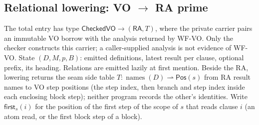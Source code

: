 \subsection{Relational lowering: VO $\to$ RA prime}
The total entry has type
$\mathsf{CheckedVO}\to(\mathsf{RA},T)$, where the private carrier pairs an
immutable VO borrow with the analysis returned by WF-VO. Only the checker
constructs this carrier; a caller-supplied analysis is not evidence of WF-VO.
State $(D,M,p,B)$: emitted definitions, latest result per clause, optional
prefix, its heading. Relations are emitted lazily at first mention. Beside
the RA, lowering returns the seam side table
$T:\operatorname{names}(D)\rightharpoonup\mathsf{Pos}(s)$ from RA result names
to VO step positions (the step index, then branch and step index inside each
enclosing block step); neither program records the other's identities.
Write $\mathsf{first}_s(i)$ for the position of the first step of the scope
of $s$ that reads clause $i$ (an atom read, or the first block step of a block).
